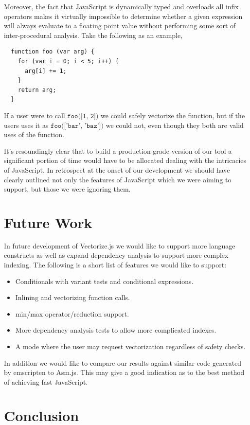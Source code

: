 \documentclass[conference]{IEEEtran}
\begin{document}
Moreover, the fact that JavaScript is dynamically typed and overloads all
infix operators makes it virtually impossible to determine whether a given
expression will always evaluate to a floating point value without performing
some sort of inter-procedural analysis. Take the following as an example,
\begin{verbatim}
  function foo (var arg) {
    for (var i = 0; i < 5; i++) {
      arg[i] += 1;
    }
    return arg;
  }
\end{verbatim}
If a user were to call $\texttt{foo([1, 2])}$ we could safely vectorize the
function, but if the users uses it as $\texttt{foo(['bar', 'baz'])}$ we could
not, even though they both are valid uses of the function.

It's resoundingly clear that to build a production grade version of our tool
a significant portion of time would have to be allocated dealing with the
intricacies of JavaScript. In retrospect at the onset of our development we
should have clearly outlined not only the features of JavaScript which we
were aiming to support, but those we were ignoring them.

\section{Future Work}

In future development of Vectorize.js we would like to support more language
constructs as well as expand dependency analysis to support more complex indexing.
The following is a short list of features we would like to support:
\begin{itemize}
    \item Conditionals with variant tests and conditional expressions.
    \item Inlining and vectorizing function calls.
    \item min/max operator/reduction support. 
    \item More dependency analysis tests to allow more complicated indexes.
    \item A mode where the user may request vectorization regardless of 
        safety checks.
\end{itemize}

In addition we would like to compare our results against similar code generated
by emscripten to Asm.js. This may give a good indication as to the best method 
of achieving fast JavaScript.

\section{Conclusion}
\end{document}
